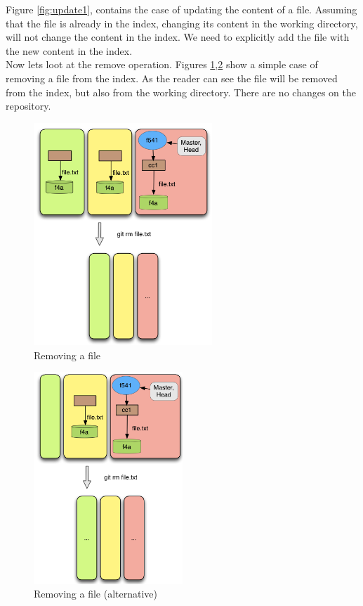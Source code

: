 Figure \ref{fig:update1}, contains the case of updating the content of a file.
Assuming that the file is already in the index, changing its content in the 
working directory, will not change the content in the index. We need to 
explicitly add the file with the new content in the index. \\ 

Now lets loot at the remove operation. Figures \ref{fig:remove1},\ref{fig:remove2} 
show a simple case of
removing a file from the index. As the reader can see the file will be
removed from the index, but also from the working directory. 
There are no changes on the repository.


\begin{figure}[tp]
   \centering
   \includegraphics[width=0.6\textwidth]{images/remove1.png}
   \caption{Removing a file}\label{fig:remove1}
\end{figure}

\begin{figure}[tp]
   \centering
   \includegraphics[width=0.5\textwidth]{images/remove2.png}
   \caption{Removing a file (alternative)}\label{fig:remove2}
\end{figure}



